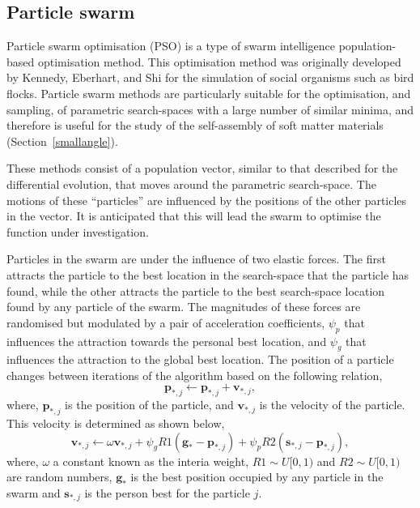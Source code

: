 \subsection{Particle swarm}
\label{sec:partswarm}
Particle swarm optimisation (PSO) is a type of swarm intelligence population-based optimisation method.
This optimisation method was originally developed by Kennedy, Eberhart, and Shi for the simulation of social organisms such as bird flocks.\autocite{kennedy_particle_1995,shi_modified_1998}
Particle swarm methods are particularly suitable for the optimisation, and sampling, of parametric search-spaces with a large number of similar minima, and therefore is useful for the study of the self-assembly of soft matter materials (Section~\ref{smallangle}).

These methods consist of a population vector, similar to that described for the differential evolution, that moves around the parametric search-space.
The motions of these ``particles'' are influenced by the positions of the other particles in the vector.\autocite{poli_analysis_2008}
It is anticipated that this will lead the swarm to optimise the function under investigation.

Particles in the swarm are under the influence of two elastic forces.
The first attracts the particle to the best location in the search-space that the particle has found, while the other attracts the particle to the best search-space location found by any particle of the swarm.
The magnitudes of these forces are randomised but modulated by a pair of acceleration coefficients, $\psi_p$ that influences the attraction towards the personal best location, and $\psi_g$ that influences the attraction to the global best location.
The position of a particle changes between iterations of the algorithm based on the following relation,
%
\begin{equation}
\mathbf{p}_{*,j} \leftarrow \mathbf{p}_{*,j} + \mathbf{v}_{*,j},
\end{equation}
%
where, $\mathbf{p}_{*,j}$ is the position of the particle, and $\mathbf{v}_{*,j}$ is the velocity of the particle.
This velocity is determined as shown below,
%
\begin{equation}
\mathbf{v}_{*,j} \leftarrow \omega\mathbf{v}_{*,j} + \psi_gR1(\mathbf{g}_{*} - \mathbf{p}_{*,j}) + \psi_pR2(\mathbf{s}_{*,j} - \mathbf{p}_{*,j}),
\end{equation}
%
where, $\omega$ a constant known as the interia weight, $R1\sim U[0, 1)$ and $R2\sim U[0, 1)$ are random numbers, $\mathbf{g}_{*}$ is the best position occupied by any particle in the swarm and $\mathbf{s}_{*,j}$ is the person best for the particle $j$.

